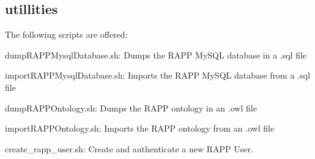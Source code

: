 \subsection*{utillities}

The following scripts are offered\-:
\begin{DoxyItemize}
\item {\ttfamily dump\-R\-A\-P\-P\-Mysql\-Database.\-sh}\-: Dumps the R\-A\-P\-P My\-S\-Q\-L database in a .sql file
\item {\ttfamily import\-R\-A\-P\-P\-Mysql\-Database.\-sh}\-: Imports the R\-A\-P\-P My\-S\-Q\-L database from a .sql file
\item {\ttfamily dump\-R\-A\-P\-P\-Ontology.\-sh}\-: Dumps the R\-A\-P\-P ontology in an .owl file
\item {\ttfamily import\-R\-A\-P\-P\-Ontology.\-sh}\-: Imports the R\-A\-P\-P ontology from an .owl file
\item {\ttfamily create\-\_\-rapp\-\_\-user.\-sh}\-: Create and authenticate a new R\-A\-P\-P User. 
\end{DoxyItemize}